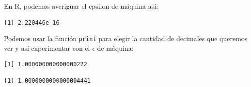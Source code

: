 \documentclass[openany]{book}
\newenvironment{Shaded}{\begin{snugshade}}{\end{snugshade}}
\newcommand{\DataTypeTok}[1]{\textcolor[rgb]{0.13,0.29,0.53}{#1}}
\newcommand{\DecValTok}[1]{\textcolor[rgb]{0.00,0.00,0.81}{#1}}
\newcommand{\KeywordTok}[1]{\textcolor[rgb]{0.13,0.29,0.53}{\textbf{#1}}}
\newcommand{\NormalTok}[1]{#1}
\newcommand{\OperatorTok}[1]{\textcolor[rgb]{0.81,0.36,0.00}{\textbf{#1}}}
\newcommand{\StringTok}[1]{\textcolor[rgb]{0.31,0.60,0.02}{#1}}
\begin{document}
En R, podemos averiguar el epsilon de máquina así:

\begin{Shaded}
\end{Shaded}

\begin{verbatim}
[1] 2.220446e-16
\end{verbatim}

Podemos usar la función \texttt{print} para elegir la cantidad de decimales que queremos ver y así experimentar con el \(\epsilon\) de máquina:

\begin{Shaded}
\end{Shaded}

\begin{verbatim}
[1] 1.000000000000000222
\end{verbatim}

\begin{Shaded}
\end{Shaded}

\begin{verbatim}
[1] 1.0000000000000004441
\end{verbatim}

\begin{Shaded}
\end{Shaded}
\end{document}
